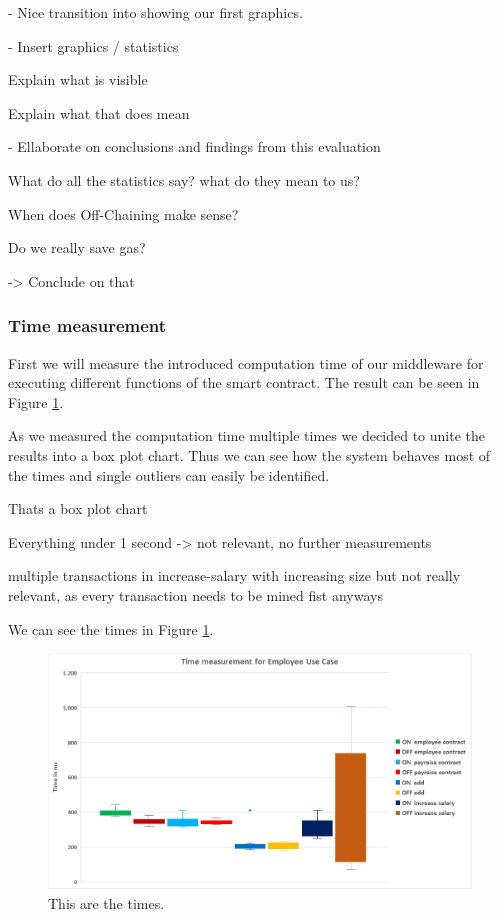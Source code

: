 - Nice transition into showing our first graphics.

- Insert graphics / statistics

Explain what is visible

Explain what that does mean

- Ellaborate on conclusions and findings from this evaluation

What do all the statistics say? what do they mean to us?

When does Off-Chaining make sense?

Do we really save gas?

-> Conclude on that

\subsubsection{Time measurement}
First we will measure the introduced computation time of our middleware for executing different functions of the smart contract. The result can be seen in Figure \ref{fig:05_time}.

As we measured the computation time multiple times we decided to unite the results into a box plot chart. Thus we can see how the system behaves most of the times and single outliers can easily be identified.

Thats a box plot chart

Everything under 1 second -> not relevant, no further measurements

multiple transactions in increase-salary with increasing size but not really relevant, as every transaction needs to be mined fist anyways

We can see the times in Figure \ref{fig:05_time}.

\begin{figure}[!htb]
\centering
\includegraphics[width=1.0\textwidth]{images/05_time.png}
\caption{\label{fig:05_time}This are the times.}
\end{figure}


